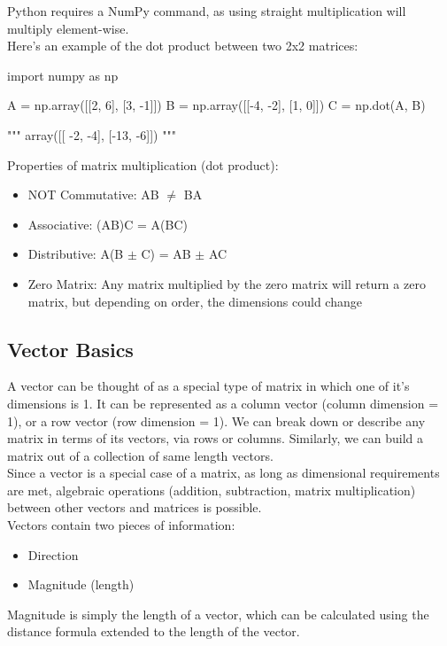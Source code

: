 Python requires a NumPy command, as using straight multiplication will multiply element-wise.
\\

Here's an example of the dot product between two 2x2 matrices:
\begin{python}
	import numpy as np
	
	A = np.array([[2, 6], [3, -1]])
	B = np.array([[-4, -2], [1, 0]])
	C = np.dot(A, B)
	
	"""
	array([[ -2,  -4],
		   [-13,  -6]])
	"""
\end{python}

Properties of matrix multiplication (dot product):
\begin{itemize}
	\item NOT Commutative: AB $\neq$ BA
	\item Associative: (AB)C = A(BC)
	\item Distributive: A(B $\pm$ C) = AB $\pm$ AC
	\item Zero Matrix: Any matrix multiplied by the zero matrix will return a zero matrix, but depending on order, the dimensions could change
\end{itemize}


\subsection{Vector Basics}\label{concept1.4}
A vector can be thought of as a special type of matrix in which one of it's dimensions is 1. It can be represented as a column vector (column dimension = 1), or a row vector (row dimension = 1). We can break down or describe any matrix in terms of its vectors, via rows or columns. Similarly, we can build a matrix out of a collection of same length vectors.
\\

Since a vector is a special case of a matrix, as long as dimensional requirements are met, algebraic operations (addition, subtraction, matrix multiplication) between other vectors and matrices is possible.
\\

Vectors contain two pieces of information:
\begin{itemize}
	\item Direction
	\item Magnitude (length)
\end{itemize}

Magnitude is simply the length of a vector, which can be calculated using the distance formula extended to the length of the vector.
\\

